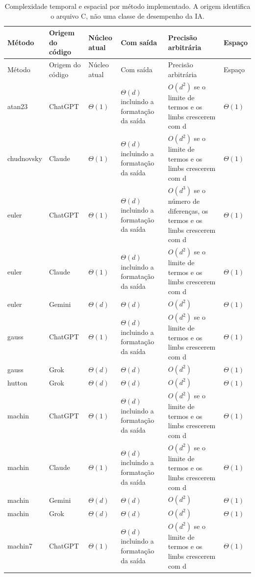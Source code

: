 \begin{longtable}{p{2.0cm}p{1.8cm}p{2.2cm}p{2.6cm}p{3.0cm}p{1.5cm}}
\caption{Complexidade temporal e espacial por método implementado. A origem identifica o arquivo C, não uma classe de desempenho da IA.}\label{tab:complexidade}\\
\toprule
Método & Origem do código & Núcleo atual & Com saída & Precisão arbitrária & Espaço\\
\midrule
\endfirsthead
\toprule
Método & Origem do código & Núcleo atual & Com saída & Precisão arbitrária & Espaço\\
\midrule
\endhead
atan23 & ChatGPT & $\Theta(1)$ & $\Theta(d)$ incluindo a formatação da saída & $O(d^2)$ se o limite de termos e os limbs crescerem com d & $\Theta(1)$\\
chudnovsky & Claude & $\Theta(1)$ & $\Theta(d)$ incluindo a formatação da saída & $O(d^2)$ se o limite de termos e os limbs crescerem com d & $\Theta(1)$\\
euler & ChatGPT & $\Theta(1)$ & $\Theta(d)$ incluindo a formatação da saída & $O(d^3)$ se o número de diferenças, os termos e os limbs crescerem com d & $\Theta(1)$\\
euler & Claude & $\Theta(1)$ & $\Theta(d)$ incluindo a formatação da saída & $O(d^2)$ se o limite de termos e os limbs crescerem com d & $\Theta(1)$\\
euler & Gemini & $\Theta(d)$ & $\Theta(d)$ & $O(d^2)$ & $\Theta(1)$\\
gauss & ChatGPT & $\Theta(1)$ & $\Theta(d)$ incluindo a formatação da saída & $O(d^2)$ se o limite de termos e os limbs crescerem com d & $\Theta(1)$\\
gauss & Grok & $\Theta(d)$ & $\Theta(d)$ & $O(d^2)$ & $\Theta(1)$\\
hutton & Grok & $\Theta(d)$ & $\Theta(d)$ & $O(d^2)$ & $\Theta(1)$\\
machin & ChatGPT & $\Theta(1)$ & $\Theta(d)$ incluindo a formatação da saída & $O(d^2)$ se o limite de termos e os limbs crescerem com d & $\Theta(1)$\\
machin & Claude & $\Theta(1)$ & $\Theta(d)$ incluindo a formatação da saída & $O(d^2)$ se o limite de termos e os limbs crescerem com d & $\Theta(1)$\\
machin & Gemini & $\Theta(d)$ & $\Theta(d)$ & $O(d^2)$ & $\Theta(1)$\\
machin & Grok & $\Theta(d)$ & $\Theta(d)$ & $O(d^2)$ & $\Theta(1)$\\
machin7 & ChatGPT & $\Theta(1)$ & $\Theta(d)$ incluindo a formatação da saída & $O(d^2)$ se o limite de termos e os limbs crescerem com d & $\Theta(1)$\\

\end{longtable}
